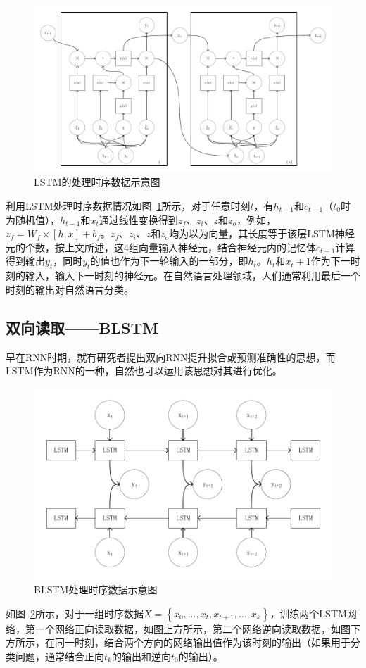 \begin{figure}[htb]
	\centering
	\includegraphics[width=0.8\linewidth]{FIGs/chapter2/lstm_time.pdf}
	\caption{LSTM的处理时序数据示意图}\label{lstmtime}
\end{figure}

利用LSTM处理时序数据情况如图~\ref{lstmtime}所示，对于任意时刻$t$，有$h_{t-1}$和$c_{t-1}$（$t_0$时为随机值），$h_{t-1}$和$x_t$通过线性变换得到$z_f$、$z_i$、$z$和$z_o$，例如，$z_f=W_{f}\times [h,x]+b_{f}$。$z_f$、$z_i$、$z$和$z_o$均为以为向量，其长度等于该层LSTM神经元的个数，按上文所述，这4组向量输入神经元，结合神经元内的记忆体$c_{t-1}$计算得到输出$y_t$，同时$y_t$的值也作为下一轮输入的一部分，即$h_t$。$h_t$和$x_t+1$作为下一时刻的输入，输入下一时刻的神经元。在自然语言处理领域，人们通常利用最后一个时刻的输出对自然语言分类。\\

\subsection{双向读取——BLSTM}
早在RNN时期，就有研究者提出双向RNN提升拟合或预测准确性的思想，而LSTM作为RNN的一种，自然也可以运用该思想对其进行优化。

\begin{figure}[htb]
	\centering
	\includegraphics[width=0.8\linewidth]{FIGs/chapter2/blstm.pdf}
	\caption{BLSTM处理时序数据示意图}\label{blstm}
\end{figure}
如图~\ref{blstm}所示，对于一组时序数据$X=\left\{ x_0,\dots,x_t,x_{t+1},\dots,x_{k} \right\}$，训练两个LSTM网络，第一个网络正向读取数据，如图上方所示，第二个网络逆向读取数据，如图下方所示，在同一时刻，结合两个方向的网络输出值作为该时刻的输出（如果用于分类问题，通常结合正向$t_k$的输出和逆向$t_0$的输出）。

